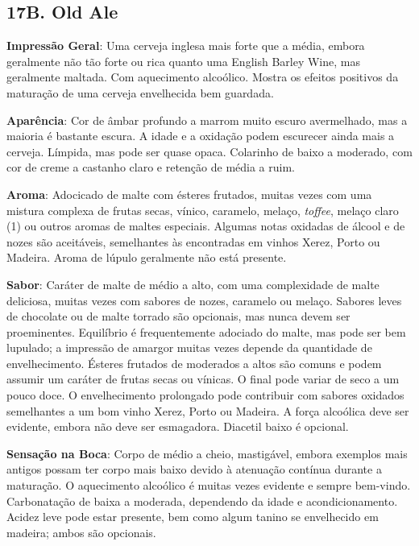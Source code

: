 \subsection*{17B. Old Ale}

\textbf{Impressão Geral}: Uma cerveja inglesa mais forte que a média, embora geralmente não tão forte ou rica quanto uma English Barley Wine, mas geralmente maltada. Com aquecimento alcoólico. Mostra os efeitos positivos da maturação de uma cerveja envelhecida bem guardada.

\textbf{Aparência}: Cor de âmbar profundo a marrom muito escuro avermelhado, mas a maioria é bastante escura. A idade e a oxidação podem escurecer ainda mais a cerveja. Límpida, mas pode ser quase opaca. Colarinho de baixo a moderado, com cor de creme a castanho claro e retenção de média a ruim.

\textbf{Aroma}: Adocicado de malte com ésteres frutados, muitas vezes com uma mistura complexa de frutas secas, vínico, caramelo, melaço, \textit{toffee}, melaço claro (1) ou outros aromas de maltes especiais. Algumas notas oxidadas de álcool e de nozes são aceitáveis, semelhantes às encontradas em vinhos Xerez, Porto ou Madeira. Aroma de lúpulo geralmente não está presente.

\textbf{Sabor}: Caráter de malte de médio a alto, com uma complexidade de malte deliciosa, muitas vezes com sabores de nozes, caramelo ou melaço. Sabores leves de chocolate ou de malte torrado são opcionais, mas nunca devem ser proeminentes. Equilíbrio é frequentemente adociado do malte, mas pode ser bem lupulado; a impressão de amargor muitas vezes depende da quantidade de envelhecimento. Ésteres frutados de moderados a altos são comuns e podem assumir um caráter de frutas secas ou vínicas. O final pode variar de seco a um pouco doce. O envelhecimento prolongado pode contribuir com sabores oxidados semelhantes a um bom vinho Xerez, Porto ou Madeira. A força alcoólica deve ser evidente, embora não deve ser esmagadora. Diacetil baixo é opcional.

\textbf{Sensação na Boca}: Corpo de médio a cheio, mastigável, embora exemplos mais antigos possam ter corpo mais baixo devido à atenuação contínua durante a maturação. O aquecimento alcoólico é muitas vezes evidente e sempre bem-vindo. Carbonatação de baixa a moderada, dependendo da idade e acondicionamento. Acidez leve pode estar presente, bem como algum tanino se envelhecido em madeira; ambos são opcionais.

